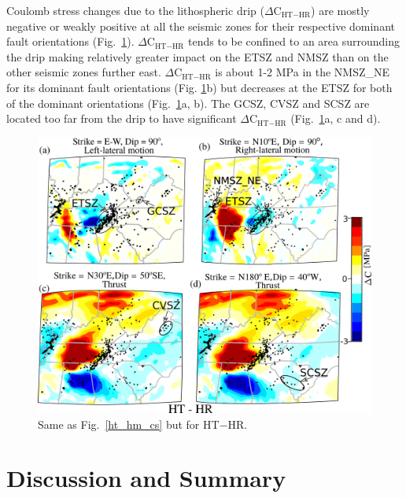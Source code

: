 \documentclass[draft,linenumbers]{agujournal2018}
\begin{document}
Coulomb stress changes due to the lithospheric drip ($\Delta$C$_{\text{HT}-\text{HR}}$) are mostly negative or weakly positive at all the seismic zones for their respective dominant fault orientations (Fig.~\ref{ht_hr_cs}). $\Delta$C$_{\text{HT}-\text{HR}}$ tends to be confined to an area surrounding the drip making relatively greater impact on the ETSZ and NMSZ than on the other seismic zones further east. $\Delta$C$_{\text{HT}-\text{HR}}$ is about 1-2 MPa in the NMSZ\_NE for its dominant fault orientations (Fig. \ref{ht_hr_cs}b) but decreases at the ETSZ for both of the dominant orientations (Fig.~\ref{ht_hr_cs}a, b). The GCSZ, CVSZ and SCSZ are located too far from the drip to have significant $\Delta$C$_{\text{HT}-\text{HR}}$ (Fig.~\ref{ht_hr_cs}a, c and d).

\begin{figure}[ht]
    \centering
    \includegraphics[width=0.75\linewidth]{figures/cs_ht_hr.png}
    \caption{Same as Fig.~\ref{ht_hm_cs} but for HT$-$HR.}
    \label{ht_hr_cs}
\end{figure}

%
\section{Discussion and Summary}
    
\end{document}
